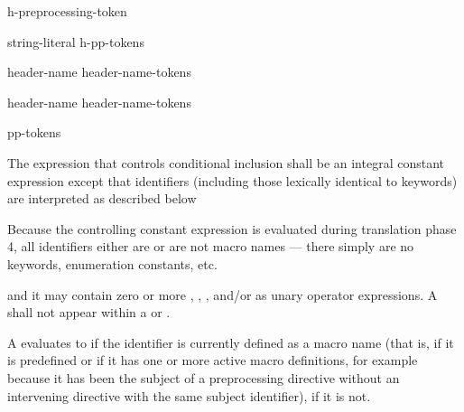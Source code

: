 \begin{bnf}
\br
    h-preprocessing-token 
\end{bnf}

\begin{bnf}
\br
    string-literal\br
    \terminal{<} h-pp-tokens \terminal{>}
\end{bnf}

%
\begin{bnf}
\br
     \terminal{(} header-name \terminal{)}\br
     \terminal{(} header-name-tokens \terminal{)}
\end{bnf}

%
\begin{bnf}
\br
     \terminal{(} header-name  \terminal{)}\br
     \terminal{(} header-name-tokens  \terminal{)}
\end{bnf}

%
\begin{bnf}
\br
     pp-tokens \terminal{)}
\end{bnf}

\pnum
The expression that controls conditional inclusion
shall be an integral constant expression except that
identifiers
(including those lexically identical to keywords)
are interpreted as described below
\begin{footnote}
Because the controlling constant expression is evaluated
during translation phase 4,
all identifiers either are or are not macro names ---
there simply are no keywords, enumeration constants, etc.
\end{footnote}
and it may contain zero or more
,
,
,
and/or 
as unary operator expressions.
A  shall not appear
within a  or .

\pnum
A  evaluates to 
if the identifier is currently defined
as a macro name
(that is, if it is predefined
or if it has one or more active macro definitions,
for example because
it has been the subject of a
preprocessing directive
without an intervening
directive with the same subject identifier),  if it is not.

